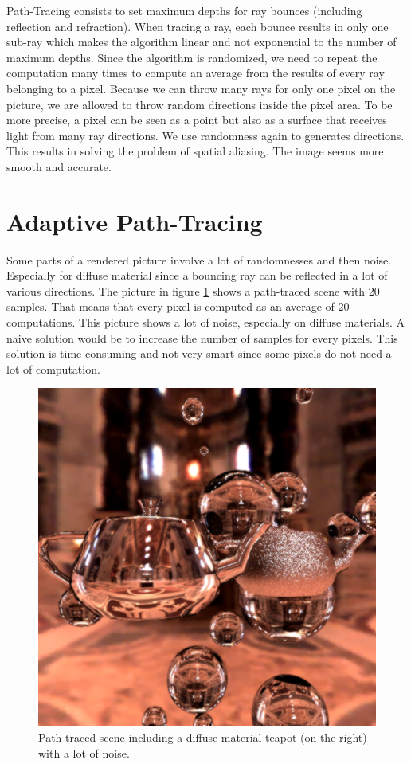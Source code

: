 \documentclass[acmsmall]{acmart}
\begin{document}
Path-Tracing consists to set maximum depths for ray bounces (including reflection and refraction). When tracing a ray, each bounce results in only one sub-ray which makes the algorithm linear and not exponential to the number of maximum depths.
Since the algorithm is randomized, we need to repeat the computation many times to compute an average from the results of every ray belonging to a pixel.
Because we can throw many rays for only one pixel on the picture, we are allowed to throw random directions inside the pixel area. To be more precise, a pixel can be seen as a point but also as a surface that receives light from many ray directions. We use randomness again to generates directions. This results in solving the problem of spatial aliasing. The image seems more smooth and accurate.

\section{Adaptive Path-Tracing}
Some parts of a rendered picture involve a lot of randomnesses and then noise. Especially for diffuse material since a bouncing ray can be reflected in a lot of various directions.
The picture in figure \ref{fig:noise} shows a path-traced scene with 20 samples. That means that every pixel is computed as an average of 20 computations.
This picture shows a lot of noise, especially on diffuse materials. A naive solution would be to increase the number of samples for every pixels.
This solution is time consuming and not very smart since some pixels do not need a lot of computation.
\begin{figure}[h]
    \centering
    
  \includegraphics[width=.6\linewidth]{img/noise.png}
    
    \caption{Path-traced scene including a diffuse material teapot (on the right) with a lot of noise.}
    \label{fig:noise}
\end{figure}
\end{document}
